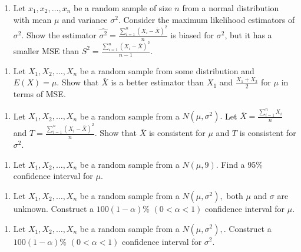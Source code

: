 \documentclass[]{book}
\providecommand{\tightlist}{%
  \setlength{\itemsep}{0pt}\setlength{\parskip}{0pt}}
\begin{document}
\begin{enumerate}
\def\labelenumi{\arabic{enumi}.}
\setcounter{enumi}{12}
\tightlist
\item
  Let \(x_1, x_2, \dots, x_n\) be a random sample of size \(n\) from a normal distribution with mean \(\mu\) and variance \(\sigma^2\). Consider the maximum likelihood estimators of \(\sigma^2\). Show the estimator \(\hat{\sigma^2} = \frac{\sum_{i=1}^n(X_i-\bar{X})^2}{n}\) is biased for \(\sigma^2\), but it has a smaller MSE than \(S^2 = \frac{\sum_{i=1}^n(X_i-\bar{X})^2}{n-1}\).
\end{enumerate}

\begin{enumerate}
\def\labelenumi{\arabic{enumi}.}
\setcounter{enumi}{13}
\tightlist
\item
  Let \(X_1, X_2, \dots, X_n\) be a random sample from some distribution and \(E(X) = \mu\). Show that \(\bar{X}\) is a better estimator than \(X_1\) and \(\frac{X_1+X_2}{2}\) for \(\mu\) in terms of MSE.
\end{enumerate}

\begin{enumerate}
\def\labelenumi{\arabic{enumi}.}
\setcounter{enumi}{14}
\tightlist
\item
  Let \(X_1, X_2, \dots, X_n\) be a random sample from a \(N(\mu, \sigma^2).\) Let \(\bar{X}= \frac{\sum_{i=1}^nX_i}{n}\) and \(T=\frac{\sum_{i=1}^n(X_i-\bar{X})^2}{n}\). Show that \(\bar{X}\) is consistent for \(\mu\) and \(T\) is consistent for \(\sigma^2.\)
\end{enumerate}

\begin{enumerate}
\def\labelenumi{\arabic{enumi}.}
\setcounter{enumi}{15}
\tightlist
\item
  Let \(X_1, X_2, \dots, X_n\) be a random sample from a \(N(\mu,9).\) Find a 95\% confidence interval for \(\mu\).
\end{enumerate}

\begin{enumerate}
\def\labelenumi{\arabic{enumi}.}
\setcounter{enumi}{16}
\tightlist
\item
  Let \(X_1, X_2, \dots, X_n\) be a random sample from a \(N(\mu,\sigma^2),\) both \(\mu\) and \(\sigma\) are unknown. Construct a \(100(1-\alpha)\%\) \((0<\alpha<1)\) confidence interval for \(\mu\).
\end{enumerate}

\begin{enumerate}
\def\labelenumi{\arabic{enumi}.}
\setcounter{enumi}{17}
\tightlist
\item
  Let \(X_1, X_2, \dots, X_n\) be a random sample from a \(N(\mu,\sigma^2),.\) Construct a \(100(1-\alpha)\%\) \((0<\alpha<1)\) confidence interval for \(\sigma^2\).
\end{enumerate}
\end{document}
